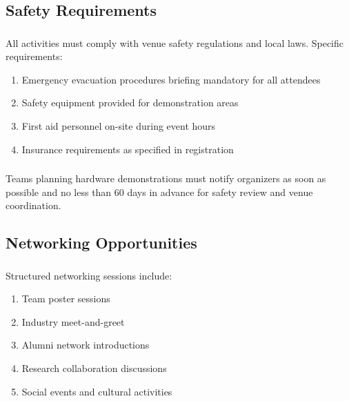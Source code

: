 \subsection{Safety Requirements}

\subsubsection{}
All activities must comply with venue safety regulations and local laws. Specific requirements:
\begin{enumerate}[noitemsep]
    \item Emergency evacuation procedures briefing mandatory for all attendees
    \item Safety equipment provided for demonstration areas
    \item First aid personnel on-site during event hours
    \item Insurance requirements as specified in registration
\end{enumerate}

\subsubsection{}
Teams planning hardware demonstrations must notify organizers as soon as possible and no less than 60 days in advance for safety review and venue coordination.

\subsection{Networking Opportunities}

\subsubsection{}
Structured networking sessions include:
\begin{enumerate}[noitemsep]
    \item Team poster sessions
    \item Industry meet-and-greet
    \item Alumni network introductions
    \item Research collaboration discussions
    \item Social events and cultural activities
\end{enumerate}